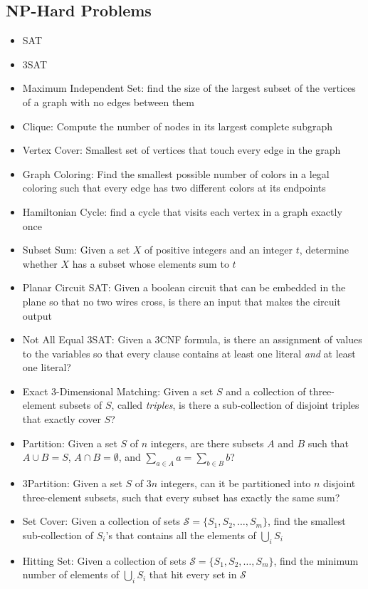 \subsection{NP-Hard Problems}
\begin{itemize}
	\item SAT
	\item 3SAT
	\item Maximum Independent Set: find the size of the largest subset of the vertices of a graph with no edges between them
	\item Clique: Compute the number of nodes in its largest complete subgraph
	\item Vertex Cover: Smallest set of vertices that touch every edge in the graph
	\item Graph Coloring: Find the smallest possible number of colors in a legal coloring such that every edge has two different colors at its endpoints
	\item Hamiltonian Cycle: find a cycle that visits each vertex in a graph exactly once
	\item Subset Sum: Given a set $X$ of positive integers and an integer $t$, determine whether $X$ has a subset whose elements sum to $t$
	\item Planar Circuit SAT: Given a boolean circuit that can be embedded in the plane so that no two wires cross, is there an input that makes the circuit output 
	\item Not All Equal 3SAT: Given a 3CNF formula, is there an assignment of values to the variables so that every clause contains at least one  literal \emph{and} at least one  literal?
	\item Exact 3-Dimensional Matching: Given a set $S$ and a collection of three-element subsets of $S$, called \emph{triples}, is there a sub-collection of disjoint triples that exactly cover $S$?
	\item Partition: Given a set $S$ of $n$ integers, are there subsets $A$ and $B$ such that $A \cup B = S$, $A \cap B = \emptyset$, and $\sum_{a \in A} a = \sum_{b \in B} b$?
	\item 3Partition: Given a set $S$ of $3n$ integers, can it be partitioned into $n$ disjoint three-element subsets, such that every subset has exactly the same sum?
	\item Set Cover: Given a collection of sets $\mathscr{S} = \{ S_1, S_2, \ldots, S_m \}$, find the smallest sub-collection of $S_i$'s that contains all the elements of $\bigcup_i S_i$
	\item Hitting Set: Given a collection of sets $\mathscr{S} = \{ S_1, S_2, \ldots, S_m \}$, find the minimum number of elements of $\bigcup_i S_i$ that hit every set in $\mathscr{S}$

\end{itemize}
